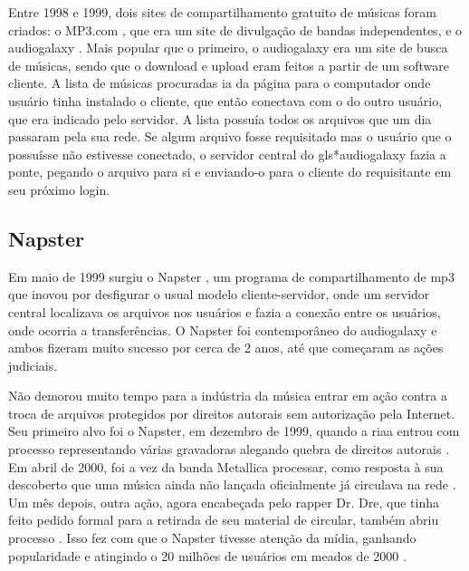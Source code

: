 Entre 1998 e 1999, dois sites de compartilhamento gratuito de músicas foram criados: o
MP3.com \cite{site:wiki-mp3.com}, que era um site de divulgação de bandas independentes,
e o \gls{audiogalaxy} \cite{site:wiki-audiogalaxy.com,revista:pnp}. Mais popular que o
primeiro, o \gls*{audiogalaxy} era um site de busca de músicas, sendo que o download e
upload eram feitos a partir de um software cliente. A lista de músicas procuradas ia da
página para o computador onde usuário tinha instalado o cliente, que então conectava
com o do outro usuário, que era indicado pelo servidor. A lista possuía todos os
arquivos que um dia passaram pela sua rede. Se algum arquivo fosse requisitado mas o
usuário que o possuísse não estivesse conectado, o servidor central do gls*{audiogalaxy}
fazia a ponte, pegando o arquivo para si e enviando-o para o cliente do requisitante em
seu próximo login.

\subsection{Napster}

Em maio de 1999 surgiu o Napster \cite{site:wiki-napster}, um programa de
compartilhamento de \gls*{mp3} que inovou por desfigurar o usual modelo
cliente-servidor, onde um servidor central localizava os arquivos nos usuários e fazia
a conexão entre os usuários, onde ocorria a transferências. O Napster foi contemporâneo
do \gls*{audiogalaxy} e ambos fizeram muito sucesso por cerca de 2 anos, até que
começaram as ações judiciais.

Não demorou muito tempo para a indústria da música entrar em ação contra a troca de
arquivos protegidos por direitos autorais sem autorização pela Internet. Seu primeiro
alvo foi o Napster, em dezembro de 1999, quando a \gls{riaa} entrou com processo
representando várias gravadoras alegando quebra de direitos autorais
\cite{site:napster-riaa}. Em abril de 2000, foi a vez da banda Metallica processar,
como resposta à sua descoberto que uma música ainda não lançada oficialmente já
circulava na rede \cite{site:napster-metallica,site:napster-metallica-orig}. Um mês
depois, outra ação, agora encabeçada pelo rapper Dr. Dre, que tinha feito pedido formal
para a retirada de seu material de circular, também abriu processo
\cite{site:napster-drdre-orig}. Isso fez com que o Napster tivesse atenção da mídia,
ganhando popularidade e atingindo o 20 milhões de usuários em meados de 2000
\cite{site:napster-use-2000}.

